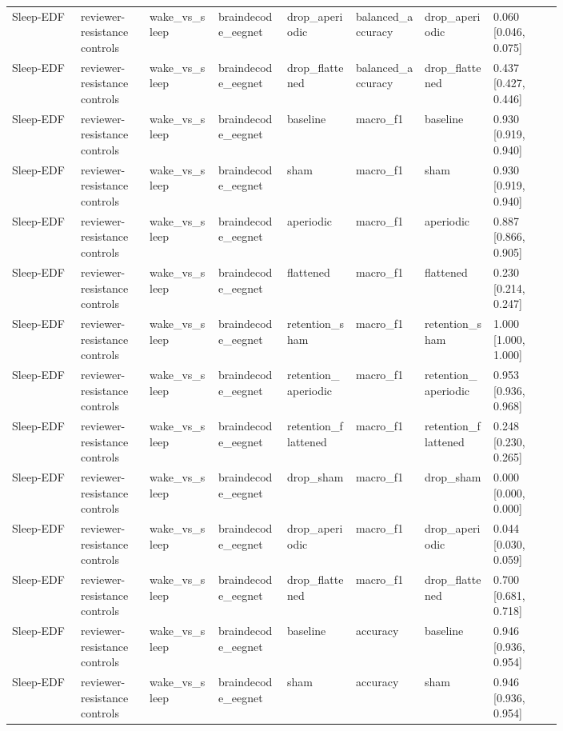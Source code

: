 \begin{longtable}{p{0.10\linewidth}p{0.10\linewidth}p{0.10\linewidth}p{0.10\linewidth}p{0.10\linewidth}p{0.10\linewidth}p{0.10\linewidth}p{0.10\linewidth}}
Sleep-EDF & reviewer-resistance controls & wake\_vs\_sleep & braindecode\_eegnet & drop\_aperiodic & balanced\_accuracy & drop\_aperiodic & 0.060 [0.046, 0.075]\\
Sleep-EDF & reviewer-resistance controls & wake\_vs\_sleep & braindecode\_eegnet & drop\_flattened & balanced\_accuracy & drop\_flattened & 0.437 [0.427, 0.446]\\
Sleep-EDF & reviewer-resistance controls & wake\_vs\_sleep & braindecode\_eegnet & baseline & macro\_f1 & baseline & 0.930 [0.919, 0.940]\\
Sleep-EDF & reviewer-resistance controls & wake\_vs\_sleep & braindecode\_eegnet & sham & macro\_f1 & sham & 0.930 [0.919, 0.940]\\
Sleep-EDF & reviewer-resistance controls & wake\_vs\_sleep & braindecode\_eegnet & aperiodic & macro\_f1 & aperiodic & 0.887 [0.866, 0.905]\\
Sleep-EDF & reviewer-resistance controls & wake\_vs\_sleep & braindecode\_eegnet & flattened & macro\_f1 & flattened & 0.230 [0.214, 0.247]\\
Sleep-EDF & reviewer-resistance controls & wake\_vs\_sleep & braindecode\_eegnet & retention\_sham & macro\_f1 & retention\_sham & 1.000 [1.000, 1.000]\\
Sleep-EDF & reviewer-resistance controls & wake\_vs\_sleep & braindecode\_eegnet & retention\_aperiodic & macro\_f1 & retention\_aperiodic & 0.953 [0.936, 0.968]\\
Sleep-EDF & reviewer-resistance controls & wake\_vs\_sleep & braindecode\_eegnet & retention\_flattened & macro\_f1 & retention\_flattened & 0.248 [0.230, 0.265]\\
Sleep-EDF & reviewer-resistance controls & wake\_vs\_sleep & braindecode\_eegnet & drop\_sham & macro\_f1 & drop\_sham & 0.000 [0.000, 0.000]\\
Sleep-EDF & reviewer-resistance controls & wake\_vs\_sleep & braindecode\_eegnet & drop\_aperiodic & macro\_f1 & drop\_aperiodic & 0.044 [0.030, 0.059]\\
Sleep-EDF & reviewer-resistance controls & wake\_vs\_sleep & braindecode\_eegnet & drop\_flattened & macro\_f1 & drop\_flattened & 0.700 [0.681, 0.718]\\
Sleep-EDF & reviewer-resistance controls & wake\_vs\_sleep & braindecode\_eegnet & baseline & accuracy & baseline & 0.946 [0.936, 0.954]\\
Sleep-EDF & reviewer-resistance controls & wake\_vs\_sleep & braindecode\_eegnet & sham & accuracy & sham & 0.946 [0.936, 0.954]\\

\end{longtable}
